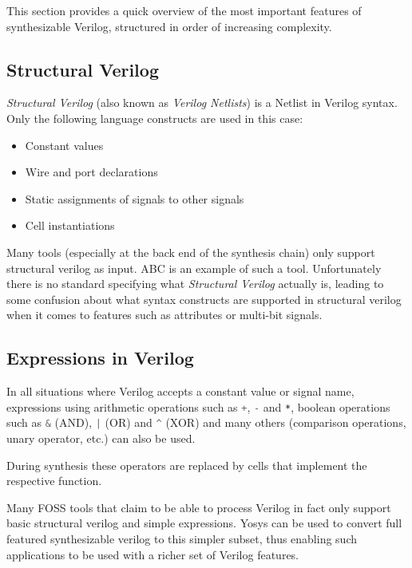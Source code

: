 This section provides a quick overview of the most important features of
synthesizable Verilog, structured in order of increasing complexity.

\subsection{Structural Verilog}

{\it Structural Verilog} (also known as {\it Verilog Netlists}) is a Netlist in
Verilog syntax. Only the following language constructs are used in this case:

\begin{itemize}
\item Constant values
\item Wire and port declarations
\item Static assignments of signals to other signals
\item Cell instantiations
\end{itemize}

Many tools (especially at the back end of the synthesis chain) only support
structural verilog as input. ABC is an example of such a tool. Unfortunately
there is no standard specifying what {\it Structural Verilog} actually is,
leading to some confusion about what syntax constructs are supported in
structural verilog when it comes to features such as attributes or multi-bit
signals.

\subsection{Expressions in Verilog}

In all situations where Verilog accepts a constant value or signal name, 
expressions using arithmetic operations such as
\lstinline[language=Verilog]{+}, \lstinline[language=Verilog]{-} and \lstinline[language=Verilog]{*},
boolean operations such as
\lstinline[language=Verilog]{&} (AND), \lstinline[language=Verilog]{|} (OR) and \lstinline[language=Verilog]{^} (XOR)
and many others (comparison operations, unary operator, etc.) can also be used.

During synthesis these operators are replaced by cells that implement the respective function.

Many FOSS tools that claim to be able to process Verilog in fact only support
basic structural verilog and simple expressions. Yosys can be used to convert
full featured synthesizable verilog to this simpler subset, thus enabling such
applications to be used with a richer set of Verilog features.

